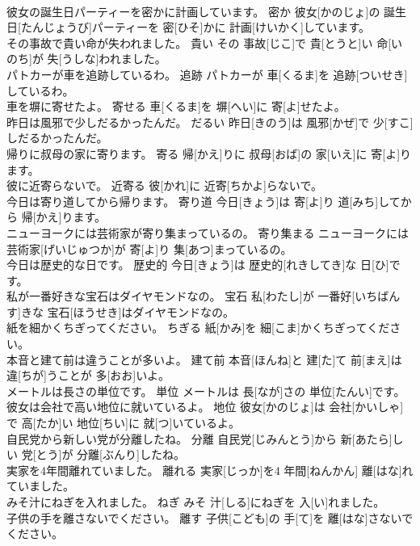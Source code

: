\documentclass[8pt]{extreport}
\begin{document}
\begin{CJK}{UTF8}{min}
\\	彼女の誕生日パーティーを密かに計画しています。	密か	彼女[かのじょ]の 誕生日[たんじょうび]パーティーを 密[ひそ]かに 計画[けいかく]しています。	
\\	その事故で貴い命が失われました。	貴い	その 事故[じこ]で 貴[とうと]い 命[いのち]が 失[うしな]われました。	
\\	パトカーが車を追跡しているわ。	追跡	パトカーが 車[くるま]を 追跡[ついせき]しているわ。	
\\	車を塀に寄せたよ。	寄せる	車[くるま]を 塀[へい]に 寄[よ]せたよ。	
\\	昨日は風邪で少しだるかったんだ。	だるい	昨日[きのう]は 風邪[かぜ]で 少[すこ]しだるかったんだ。	
\\	帰りに叔母の家に寄ります。	寄る	帰[かえ]りに 叔母[おば]の 家[いえ]に 寄[よ]ります。	
\\	彼に近寄らないで。	近寄る	彼[かれ]に 近寄[ちかよ]らないで。	
\\	今日は寄り道してから帰ります。	寄り道	今日[きょう]は 寄[よ]り 道[みち]してから 帰[かえ]ります。	
\\	ニューヨークには芸術家が寄り集まっているの。	寄り集まる	ニューヨークには 芸術家[げいじゅつか]が 寄[よ]り 集[あつ]まっているの。	
\\	今日は歴史的な日です。	歴史的	今日[きょう]は 歴史的[れきしてき]な 日[ひ]です。	
\\	私が一番好きな宝石はダイヤモンドなの。	宝石	私[わたし]が 一番好[いちばん す]きな 宝石[ほうせき]はダイヤモンドなの。	
\\	紙を細かくちぎってください。	ちぎる	紙[かみ]を 細[こま]かくちぎってください。	
\\	本音と建て前は違うことが多いよ。	建て前	本音[ほんね]と 建[た]て 前[まえ]は 違[ちが]うことが 多[おお]いよ。	
\\	メートルは長さの単位です。	単位	メートルは 長[なが]さの 単位[たんい]です。	
\\	彼女は会社で高い地位に就いているよ。	地位	彼女[かのじょ]は 会社[かいしゃ]で 高[たか]い 地位[ちい]に 就[つ]いているよ。	
\\	自民党から新しい党が分離したね。	分離	自民党[じみんとう]から 新[あたら]しい 党[とう]が 分離[ぶんり]したね。	
\\	実家を4年間離れていました。	離れる	実家[じっか]を4 年間[ねんかん] 離[はな]れていました。	
\\	みそ汁にねぎを入れました。	ねぎ	みそ 汁[しる]にねぎを 入[い]れました。	
\\	子供の手を離さないでください。	離す	子供[こども]の 手[て]を 離[はな]さないでください。	

\end{CJK}
\end{document}
